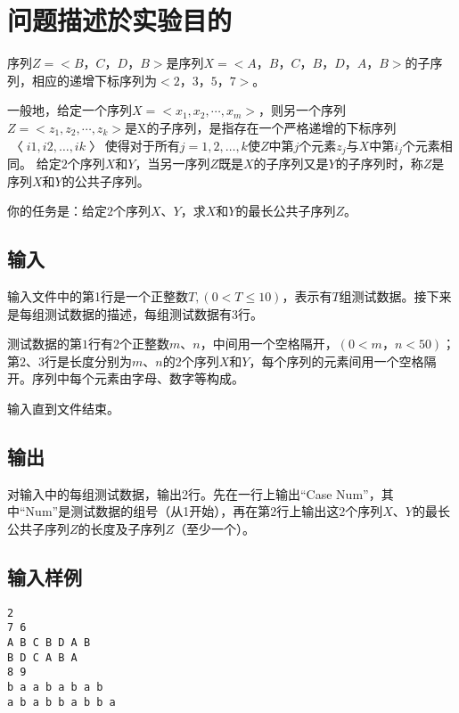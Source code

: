 \documentclass{zjureport}
\begin{document}
\thispagestyle{empty}

\makeCover


\section{问题描述於实验目的}
序列$Z=<B，C，D，B>$是序列$X=<A，B，C，B，D，A，B>$的子序列，相应的递增下标序列为$<2，3，5，7>$。\par
一般地，给定一个序列$X=<x_1,x_2,\cdots,x_m>$，则另一个序列$Z=<z_1,z_2,\cdots,z_k>$是X的子序列，是指存在一个严格递增的下标序列$〈i1,i2,…,ik〉$使得对于所有$j=1,2,…,k$使$Z$中第$j$个元素$z_j$与$X$中第$i_j$个元素相同。
给定$2$个序列$X$和$Y$，当另一序列$Z$既是$X$的子序列又是$Y$的子序列时，称$Z$是序列$X$和$Y$的公共子序列。\par
你的任务是：给定$2$个序列$X、Y$，求$X$和$Y$的最长公共子序列$Z$。\par


\subsection{输入}
输入文件中的第1行是一个正整数$T,(0 < T \leqslant 10)$，表示有$T$组测试数据。接下来是每组测试数据的描述，每组测试数据有$3$行。\par
测试数据的第$1$行有$2$个正整数$m、n$，中间用一个空格隔开，$(0<m，n<50)$；第$2、3$行是长度分别为$m、n$的$2$个序列$X$和$Y$，每个序列的元素间用一个空格隔开。序列中每个元素由字母、数字等构成。\par
输入直到文件结束。\par

\subsection{输出}
对输入中的每组测试数据，输出2行。先在一行上输出“Case Num”，其中“Num”是测试数据的组号（从1开始），再在第2行上输出这2个序列$X、Y$的最长公共子序列$Z$的长度及子序列$Z$（至少一个）。\par

\subsection{输入样例}
\begin{lstlisting}
2
7 6
A B C B D A B
B D C A B A
8 9
b a a b a b a b
a b a b b a b b a
\end{lstlisting}
\end{document}
